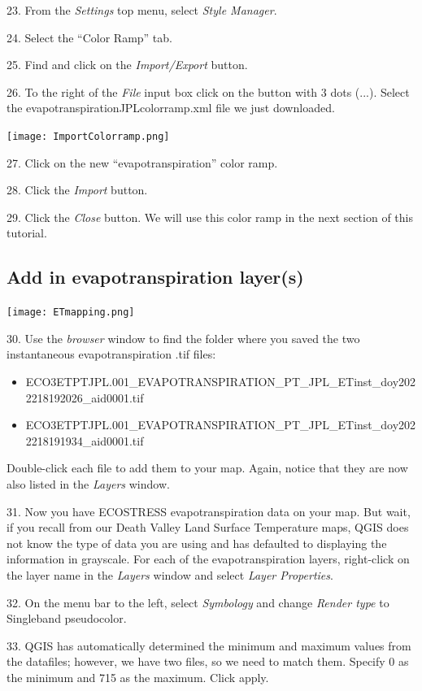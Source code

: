 \documentclass[oneside,a4paper,11pt,explicit]{book}
\begin{document}
23. From the \textit{Settings} top menu, select \textit{Style Manager}.

24. Select the ``Color Ramp'' tab.

25. Find and click on the \textit{Import/Export} button.

26. To the right of the \textit{File} input box click on the button with 3 dots (...). Select the evapotranspirationJPLcolorramp.xml file we just downloaded.

\centerline{\texttt{[image: ImportColorramp.png]}} 

27. Click on the new ``evapotranspiration'' color ramp.

28. Click the \textit{Import} button.

29. Click the \textit{Close} button. We will use this color ramp in the next section of this tutorial.

\subsection{Add in evapotranspiration layer(s)}

\centerline{\texttt{[image: ETmapping.png]}}

30. Use the \textit{browser} window to find the folder where you saved the two instantaneous evapotranspiration .tif files: 
\begin{itemize}
	\item ECO3ETPTJPL.001\_EVAPOTRANSPIRATION\_PT\_JPL\_ETinst\_doy2022218192026\_aid0001.tif
	\item ECO3ETPTJPL.001\_EVAPOTRANSPIRATION\_PT\_JPL\_ETinst\_doy2022218191934\_aid0001.tif
\end{itemize}
Double-click each file to add them to your map. Again, notice that they are now also listed in the \textit{Layers} window.

31. Now you have ECOSTRESS evapotranspiration data on your map. But wait, if you recall from our Death Valley Land Surface Temperature maps, QGIS does not know the type of data you are using and has defaulted to displaying the information in grayscale. For each of the evapotranspiration layers, right-click on the layer name in the \textit{Layers} window and select \textit{Layer Properties}. 

32. On the menu bar to the left, select \textit{Symbology} and change \textit{Render type} to Singleband pseudocolor. 

33. QGIS has automatically determined the minimum and maximum values from the datafiles; however, we have two files, so we need to match them. Specify 0 as the minimum and 715 as the maximum. Click apply.
\end{document}
